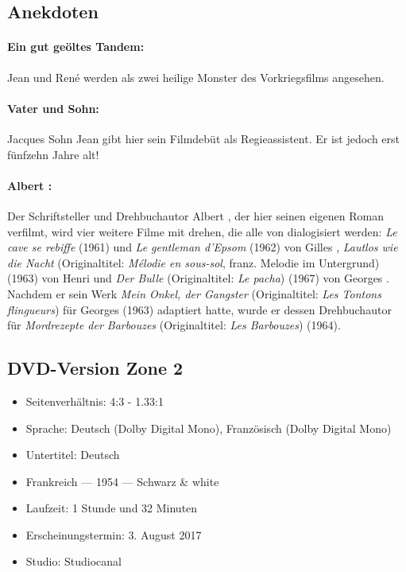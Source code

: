 \subsection*{Anekdoten} 

\paragraph{Ein gut geöltes Tandem:} Jean  und René  werden als zwei heilige Monster des Vorkriegsfilms angesehen.
\paragraph{ Vater und Sohn:} Jacques  Sohn Jean gibt hier sein Filmdebüt als Regieassistent. Er ist jedoch erst fünfzehn Jahre alt!
\paragraph{Albert :} Der Schriftsteller und Drehbuchautor Albert , der hier seinen eigenen Roman verfilmt, wird vier weitere Filme mit  drehen, die alle von  dialogisiert werden: \emph{Le cave se rebiffe} (1961) und \emph{Le gentleman d'Epsom} (1962) von Gilles , \emph{Lautlos wie die Nacht} (Originaltitel: \emph{Mélodie en sous-sol}, franz. \glqq{}Melodie im Untergrund\grqq{}) (1963) von Henri  und \emph{Der Bulle} (Originaltitel: \emph{Le pacha}) (1967) von Georges . Nachdem er sein Werk \emph{Mein Onkel, der Gangster} (Originaltitel: \emph{Les Tontons flingueurs}) für Georges  (1963) adaptiert hatte, wurde er dessen Drehbuchautor für \emph{Mordrezepte der Barbouzes} (Originaltitel: \emph{Les Barbouzes}) (1964).

\subsection*{DVD-Version Zone 2}

\begin{itemize}\itemsep=-3pt
    \item Seitenverhältnis: 4:3 - 1.33:1
    \item Sprache: Deutsch (Dolby Digital Mono), Französisch (Dolby Digital Mono)
    \item Untertitel: Deutsch
    \item Frankreich --- 1954 --- Schwarz \& white
    \item Laufzeit: 1 Stunde und 32 Minuten
    \item Erscheinungstermin: 3. August 2017
    \item Studio: Studiocanal
\end{itemize}

